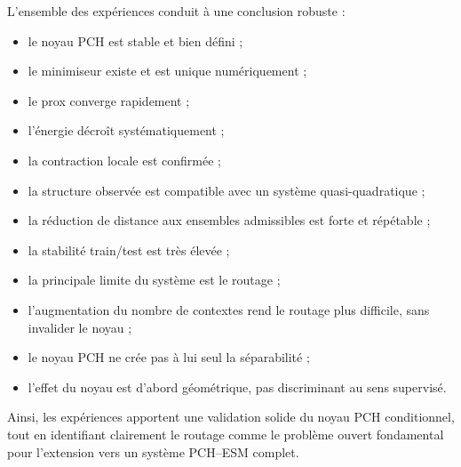 \documentclass[11pt,a4paper]{article}
\newcommand{\1}{\mathbf 1}
\begin{document}
L’ensemble des expériences conduit à une conclusion robuste :

\begin{itemize}[leftmargin=2em]
\item le noyau PCH est stable et bien défini ;
\item le minimiseur existe et est unique numériquement ;
\item le prox converge rapidement ;
\item l’énergie décroît systématiquement ;
\item la contraction locale est confirmée ;
\item la structure observée est compatible avec un système quasi-quadratique ;
\item la réduction de distance aux ensembles admissibles est forte et répétable ;
\item la stabilité train/test est très élevée ;
\item la principale limite du système est le routage ;
\item l’augmentation du nombre de contextes rend le routage plus difficile, sans invalider le noyau ;
\item le noyau PCH ne crée pas à lui seul la séparabilité ;
\item l’effet du noyau est d’abord géométrique, pas discriminant au sens supervisé.
\end{itemize}

Ainsi, les expériences apportent une validation solide du noyau PCH conditionnel, tout en identifiant clairement le routage comme le problème ouvert fondamental pour l’extension vers un système PCH--ESM complet.
\end{document}
